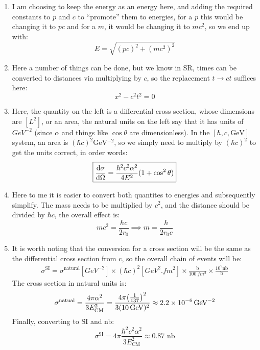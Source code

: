 \documentclass[12pt]{article}
\begin{document}
\begin{enumerate}[label=\alph*)]
\item I am choosing to keep the energy as an energy here, and adding the required constants to $p$ and $c$ to ``promote'' them to energies, for a $p$ this would be changing it to $pc$ and for a $m$, it would be changing it to $mc^2$, so we end up with:
  \begin{equation}
    \label{eq:p1a}
    \boxed{E=\sqrt{(pc)^2+(mc^2)^2}}
  \end{equation}
\item Here a number of things can be done, but we know in SR, times can be converted to distances via multiplying by $c$, so the replacement $t\to ct$ suffices here:
  \begin{equation}
    \label{eq:p1c}
    \boxed{x^2-c^2t^2=0}
  \end{equation}
\item Here, the quantity on the left is a differential cross section, whose dimensions are $[L^2]$, or an area, the natural units on the left say that it has units of $\unit{GeV^{-2}}$ (since $\alpha$ and things like $\cos\theta$ are dimensionless). In the $[\hbar,c,\unit{\GeV}]$ system, an area is $(\hbar c)^2\unit{\GeV^{-2}}$, so we simply need to multiply by $(\hbar c)^2$ to get the units correct, in order words:
  \begin{equation}
    \label{eq:p2c}
    \boxed{\dv{\sigma}{\Omega}=\frac{\hbar^2c^2\alpha^2}{4E^2}(1+\cos^2\theta)}
  \end{equation}
\item Here to me it is easier to convert both quantites to energies and subsequently simplify. The mass needs to be multiplied by $c^2$, and the distance should be divided by $\hbar c$, the overall effect is:
  \begin{equation}
    \label{eq:p1d}
    mc^2=\frac{\hbar c}{2r_0}\implies
    \boxed{m=\frac{\hbar}{2r_0c}}
  \end{equation}
\item It is worth noting that the conversion for a cross section will be the same as the differential cross section from c, so the overall chain of events will be:
  \begin{align*}
    \sigma^{\text{SI}}=\sigma^{\text{natural}}[\unit{GeV^{-2}}]
    \times(\hbar c)^2[\unit{GeV^2.fm^2}]
    \times\frac{\text{b}}{\SI{100}{fm^2}}
    \times\frac{10^9\text{nb}}{\text{b}}
  \end{align*}
  The cross section in natural units is:
  \begin{align*}
    \sigma^{\text{natual}}=\frac{4\pi\alpha^2}{3E_{\text{CM}}^2}
    =\frac{4\pi\qty(\frac1{137})^2}{3(\SI{10}{GeV})^2}
    \approx\SI{2.2e-6}{GeV^{-2}}
  \end{align*}
  Finally, converting to SI and nb:
  \begin{equation}
    \label{eq:p1e}
    \boxed{\sigma^{\text{SI}}
      =4\pi\frac{\hbar^2c^2\alpha^2}{3E^2_{\text{CM}}}
      \approx0.87\text{ nb}}
  \end{equation}
\end{enumerate}
\newpage
\end{document}
